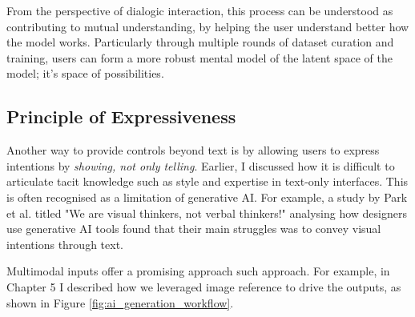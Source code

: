 From the perspective of dialogic interaction, this process can be understood as contributing to mutual understanding, by helping the user understand better how the model works. Particularly through multiple rounds of dataset curation and training, users can form a more robust mental model of the latent space of the model; it's space of possibilities.

\subsection{Principle of Expressiveness}

Another way to provide controls beyond text is by allowing users to express intentions by \textit{showing, not only telling}. Earlier, I discussed how it is difficult to articulate tacit knowledge such as style and expertise in text-only interfaces. This is often recognised as a limitation of generative AI. For example, a study by Park et al. \cite{Park2024-gw} titled "We are visual thinkers, not verbal thinkers!" analysing how designers use generative AI tools found that their main struggles was to convey visual intentions through text.

Multimodal inputs offer a promising approach such approach. For example, in Chapter 5 I described how we leveraged image reference to drive the outputs, as shown in Figure  \ref{fig:ai_generation_workflow}.


